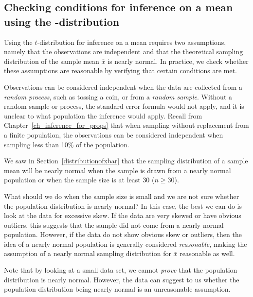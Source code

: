 

\D{\newpage}

\subsection[Checking conditions for inference on a mean using the $t$-distribution]{Checking conditions for inference on a mean using the -distribution}
\label{tDistSolutionToSEProblem}

Using the $t$-distribution for inference on a mean requires two assumptions, namely that the observations are independent and that the theoretical sampling distribution of the sample mean $\bar{x}$ is nearly normal.  In practice, we check whether these assumptions are reasonable by verifying that certain conditions are met.  


\begin{description}
\setlength{\itemsep}{0mm}
\item[Independent.] Observations can be considered independent when the data are collected from a \emph{random process}, such as tossing a coin, or from a \emph{random sample}.    Without a random sample or process, the standard error formula would not apply, and it is unclear to what population the inference would apply.  Recall from Chapter~\ref{ch_inference_for_props} that when sampling without replacement from a finite population, the observations can be considered independent when sampling less than 10\% of the population.  
\item[Nearly normal sampling distribution.] We saw in Section~\ref{distributionofxbar} that the sampling distribution of a sample mean will be nearly normal when the sample is drawn from a nearly normal population or when the sample size is at least 30 ($n\ge 30$).     
\end{description}

What should we do when the sample size is small and we are not sure whether the population distribution is nearly normal?  In this case, the best we can do is look at the data for excessive skew.  If the data are very skewed or have obvious outliers, this suggests that the sample did not come from a nearly normal population.  However, if the data do not show obvious skew or outliers, then the idea of a nearly normal population is generally considered \emph{reasonable}, making the assumption of a nearly normal sampling distribution for $\bar{x}$ reasonable as well.

Note that by looking at a small data set, we cannot \emph{prove} that the population distribution is nearly normal.  However, the data can suggest to us whether the population distribution being nearly normal is an unreasonable assumption.  

